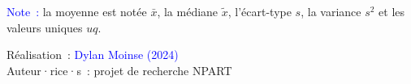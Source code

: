 \begin{table}[h!]
{\begin{tabular}{p{}p{}p{}p{}p{}p{}p{}}
        \hline
    \end{tabular}}
    \caption*{}
    \vspace{5pt}
        \begin{flushleft}\scriptsize{
        \textcolor{blue}{Note~:} la moyenne est notée \(\bar{x}\), la médiane \(\tilde{x}\), l'écart-type \(s\), la variance \(s^2\) et les valeurs uniques \(uq\).
        }\end{flushleft}
        \begin{flushright}\scriptsize
        Réalisation~: \textcolor{blue}{Dylan Moinse (2024)}
        \\
        Auteur·rice·s~: projet de recherche \acrshort{NPART}
        \end{flushright}
        \end{table}